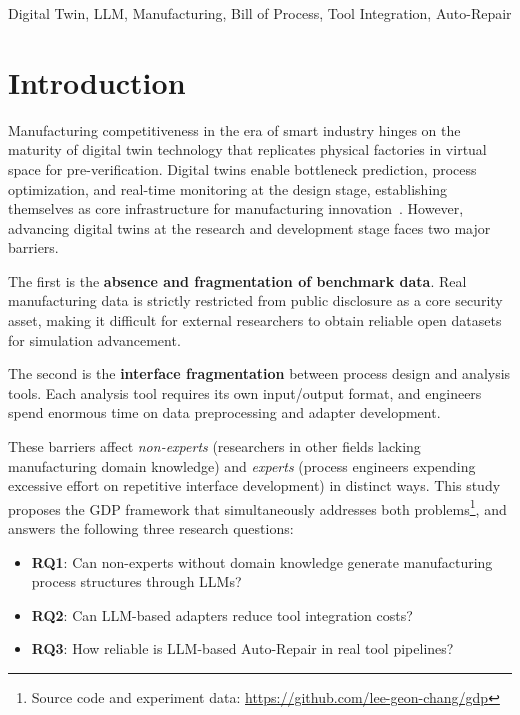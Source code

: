 \documentclass[conference]{IEEEtran}
\begin{document}
\begin{IEEEkeywords}
Digital Twin, LLM, Manufacturing, Bill of Process, Tool Integration, Auto-Repair
\end{IEEEkeywords}

\section{Introduction}

Manufacturing competitiveness in the era of smart industry hinges on the maturity of digital twin technology that replicates physical factories in virtual space for pre-verification. Digital twins enable bottleneck prediction, process optimization, and real-time monitoring at the design stage, establishing themselves as core infrastructure for manufacturing innovation~\cite{b1}. However, advancing digital twins at the research and development stage faces two major barriers.

The first is the \textbf{absence and fragmentation of benchmark data}. Real manufacturing data is strictly restricted from public disclosure as a core security asset, making it difficult for external researchers to obtain reliable open datasets for simulation advancement.

The second is the \textbf{interface fragmentation} between process design and analysis tools. Each analysis tool requires its own input/output format, and engineers spend enormous time on data preprocessing and adapter development.

These barriers affect \textit{non-experts} (researchers in other fields lacking manufacturing domain knowledge) and \textit{experts} (process engineers expending excessive effort on repetitive interface development) in distinct ways. This study proposes the GDP framework that simultaneously addresses both problems\footnote{Source code and experiment data: \url{https://github.com/lee-geon-chang/gdp}}, and answers the following three research questions:

\begin{itemize}
\item \textbf{RQ1}: Can non-experts without domain knowledge generate manufacturing process structures through LLMs?
\item \textbf{RQ2}: Can LLM-based adapters reduce tool integration costs?
\item \textbf{RQ3}: How reliable is LLM-based Auto-Repair in real tool pipelines?
\end{itemize}
\end{document}
